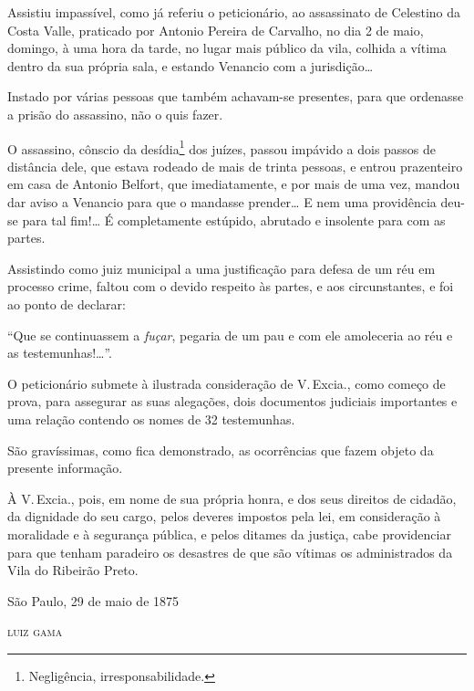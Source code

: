 Assistiu impassível, como já referiu o peticionário, ao assassinato de
Celestino da Costa Valle, praticado por Antonio Pereira de Carvalho, no
dia 2 de maio, domingo, à uma hora da tarde, no lugar mais público da
vila, colhida a vítima dentro da sua própria sala, e estando Venancio
com a jurisdição\ldots{}

Instado por várias pessoas que também achavam-se presentes, para que
ordenasse a prisão do assassino, não o quis fazer.

O assassino, cônscio da desídia\footnote{ Negligência,
  irresponsabilidade.} dos juízes, passou impávido a dois passos de
distância dele, que estava rodeado de mais de trinta pessoas, e entrou
prazenteiro em casa de Antonio Belfort, que imediatamente, e por mais de
uma vez, mandou dar aviso a Venancio para que o mandasse prender\ldots{} E
nem uma providência deu-se para tal fim!\ldots{} É completamente estúpido,
abrutado e insolente para com as partes.

Assistindo como juiz municipal a uma justificação para defesa de um réu
em processo crime, faltou com o devido respeito às partes, e aos
circunstantes, e foi ao ponto de declarar:

``Que se continuassem a \emph{fuçar}, pegaria de um pau e com ele
amoleceria ao réu e as testemunhas!\ldots{}''.

O peticionário submete à ilustrada consideração de V.\,Excia., como
começo de prova, para assegurar as suas alegações, dois documentos
judiciais importantes e uma relação contendo os nomes de 32 testemunhas.

São gravíssimas, como fica demonstrado, as ocorrências que fazem objeto
da presente informação.

À V.\,Excia., pois, em nome de sua própria honra, e dos seus direitos de
cidadão, da dignidade do seu cargo, pelos deveres impostos pela lei, em
consideração à moralidade e à segurança pública, e pelos ditames da
justiça, cabe providenciar para que tenham paradeiro os desastres de que
são vítimas os administrados da Vila do Ribeirão Preto.

\begin{flushright}
São Paulo, 29 de maio de 1875

\textsc{luiz gama}
\end{flushright}

\asterisc{}
